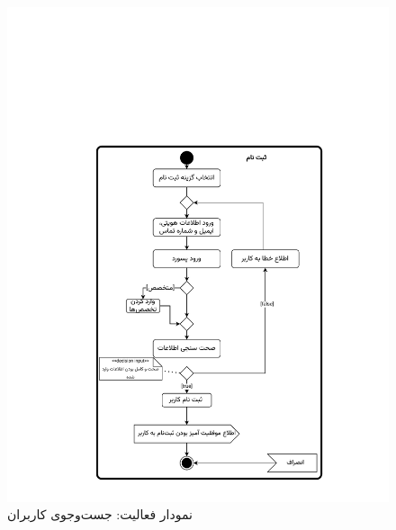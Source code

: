 \begin{figure}[ht!]
	\centering
	\includegraphics[scale=0.8, page=4]{figs/OOD-activity1-10.pdf}
	\caption{نمودار فعالیت: جست‌وجوی کاربران}
\end{figure}
\FloatBarrier
\newpage


